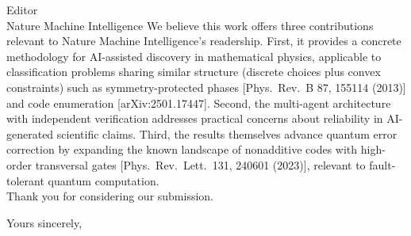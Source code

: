 \documentclass[a4paper,12pt]{letter}
\begin{document}
\begin{letter}{Editor\\Nature Machine Intelligence}
    We believe this work offers three contributions relevant to Nature Machine Intelligence's readership. First, it provides a concrete methodology for AI-assisted discovery in mathematical physics, applicable to classification problems sharing similar structure (discrete choices plus convex constraints) such as symmetry-protected phases [Phys.\ Rev.\ B 87, 155114 (2013)] and code enumeration [arXiv:2501.17447]. Second, the multi-agent architecture with independent verification addresses practical concerns about reliability in AI-generated scientific claims. Third, the results themselves advance quantum error correction by expanding the known landscape of nonadditive codes with high-order transversal gates [Phys.\ Rev.\ Lett.\ 131, 240601 (2023)], relevant to fault-tolerant quantum computation.\\

    Thank you for considering our submission.\\

    \closing{Yours sincerely,}

    \vspace{1.5em}

\end{letter}
\end{document}
